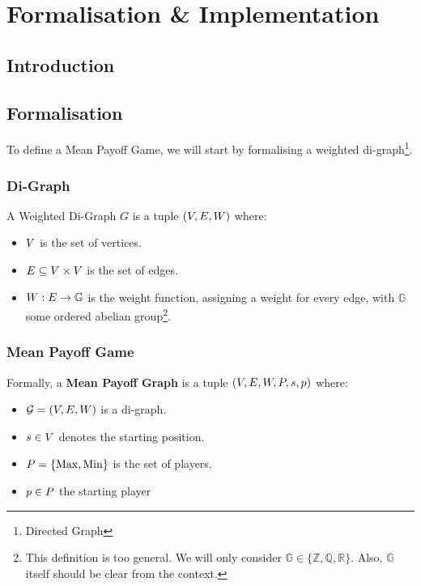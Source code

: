 \chapter{Formalisation \& Implementation}
\section{Introduction}

\section{Formalisation}
To define a Mean Payoff Game, we will start by formalising a weighted di-graph\footnote{Directed Graph}.

\subsection{Di-Graph}
A Weighted Di-Graph $G$ is a tuple $(V,E,W)$ where:

\begin{itemize}
		\item $V$ is the set of vertices.
		\item $E \subseteq V\times V$ is the set of edges.
		\item $W:E\rightarrow \mathbb{G}$ is the weight function, assigning a weight for every edge, with $\mathbb{G}$ some ordered abelian group\footnote{This definition is too general. We will only consider $\mathbb{G}\in \{\mathbb{Z},\mathbb{Q},\mathbb{R}\}.$ Also, $\mathbb{G}$ itself should be clear from the context.}. 
\end{itemize}
\subsection{Mean Payoff Game}
\label{section:Formalisation:MPG}
\label{section:Formalisation:MeanPayoffGame}
\label{section:Formalisation:MeanPayoffGraph}
Formally, a \textbf{Mean Payoff Graph} is a tuple $(V,E,W,P,s,p)$ where:
\begin{itemize}
	\item $\mathcal{G}=(V,E,W)$ is a di-graph.
		\item $s\in V$ denotes the starting position.
	\item $P=\{\text{Max},\text{Min}\}$ is the set of players.
	\item $p\in P$ the starting player
\end{itemize}


